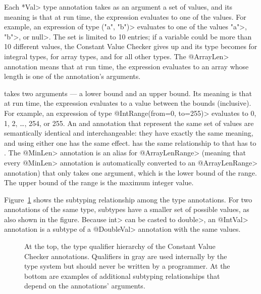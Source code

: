 Each \<*Val> type annotation takes as an argument a set of values, and its
meaning is that at run time, the expression evaluates to one of the values.  For
example, an expression of type
\<("a", "b")> evaluates to
one of the values \<"a">, \<"b">, or \<null>.
The set is limited to 10 entries; if a variable
could be more than 10 different values, the Constant Value
Checker gives up and its type becomes
 for integral types,
 for array types, and
 for all other types.
The \<@ArrayLen> annotation means that at run time, the expression
evaluates to an array whose length is one of the annotation's arguments.


 takes two arguments --- a lower
bound and an upper bound.  Its meaning is that at run time, the expression
evaluates to a value between the bounds (inclusive).  For example, an
expression of type \<@IntRange(from=0, to=255)> evaluates to
0, 1, 2, \ldots, 254, or 255.
An  and
 annotation that represent the
same set of values are semantically identical and interchangeable:  they
have exactly the same meaning, and using either one has the same effect.
 has the same relationship
to  that
 has to
.
The \<@MinLen> annotation is an alias for \<@ArrayLenRange> (meaning that every \<@MinLen> annotation
 is automatically converted to an \<@ArrayLenRange> annotation) that only takes
one argument, which is the lower bound of the range. The upper bound of the
range is the maximum integer value.

Figure~\ref{fig-value-hierarchy} shows the
subtyping relationship among the type annotations.
For two annotations of the same type, subtypes have a smaller set of
possible values, as also shown in the figure.
Because \<int> can be casted to \<double>, an \<@IntVal> annotation is a
subtype of a \<@DoubleVal> annotation with the same values.

\begin{figure}
\caption{At the top, the type qualifier hierarchy of the Constant Value Checker
annotations. Qualifiers in gray are used
internally by the type system but should never be written by a
programmer.  At the bottom are examples of additional subtyping
relationships that depend on the annotations' arguments.}
\label{fig-value-hierarchy}
\end{figure}

